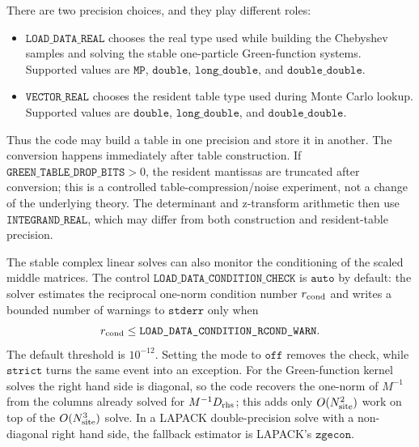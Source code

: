 \documentclass[11pt]{article}
\newcommand{\1}{\mathbf{1}}
\begin{document}
There are two precision choices, and they play different roles:
\begin{itemize}[leftmargin=2em]
  \item \(\texttt{LOAD\_DATA\_REAL}\) chooses the real type used while building
  the Chebyshev samples and solving the stable one-particle Green-function
  systems.  Supported values are \(\texttt{MP}\), \(\texttt{double}\),
  \(\texttt{long\_double}\), and \(\texttt{double\_double}\).
  \item \(\texttt{VECTOR\_REAL}\) chooses the resident table type used during
  Monte Carlo lookup.  Supported values are \(\texttt{double}\),
  \(\texttt{long\_double}\), and \(\texttt{double\_double}\).
\end{itemize}
Thus the code may build a table in one precision and store it in another.  The
conversion happens immediately after table construction.  If
\(\texttt{GREEN\_TABLE\_DROP\_BITS}>0\), the resident mantissas are truncated
after conversion; this is a controlled table-compression/noise experiment, not
a change of the underlying theory.  The determinant and z-transform arithmetic
then use \(\texttt{INTEGRAND\_REAL}\), which may differ from both construction
and resident-table precision.

The stable complex linear solves can also monitor the conditioning of the
scaled middle matrices.  The control
\(\texttt{LOAD\_DATA\_CONDITION\_CHECK}\) is \(\texttt{auto}\) by default:
the solver estimates the reciprocal one-norm condition number \(r_{\rm cond}\)
and writes a bounded number of warnings to \(\texttt{stderr}\) only when
\[
  r_{\rm cond}
  \le
  \texttt{LOAD\_DATA\_CONDITION\_RCOND\_WARN}.
\]
The default threshold is \(10^{-12}\).  Setting the mode to \(\texttt{off}\)
removes the check, while \(\texttt{strict}\) turns the same event into an
exception.  For the Green-function kernel solves the right hand side is
diagonal, so the code recovers the one-norm of \(M^{-1}\) from the columns
already solved for \(M^{-1}D_{\rm rhs}\); this adds only \(O(N_{\rm site}^2)\)
work on top of the \(O(N_{\rm site}^3)\) solve.  In a LAPACK double-precision
solve with a non-diagonal right hand side, the fallback estimator is LAPACK's
\(\texttt{zgecon}\).
\end{document}
